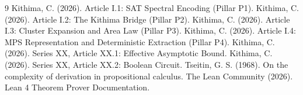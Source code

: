 \documentclass[11pt,a4paper]{article}
\begin{document}

\begin{thebibliography}{9}
  Kithima, C. (2026). Article I.1: SAT Spectral Encoding (Pillar P1).
  Kithima, C. (2026). Article I.2: The Kithima Bridge (Pillar P2).
  Kithima, C. (2026). Article I.3: Cluster Expansion and Area Law (Pillar P3).
  Kithima, C. (2026). Article I.4: MPS Representation and Deterministic Extraction (Pillar P4).
  Kithima, C. (2026). Series XX, Article XX.1: Effective Asymptotic Bound.
  Kithima, C. (2026). Series XX, Article XX.2: Boolean Circuit.
  Tseitin, G. S. (1968). On the complexity of derivation in propositional calculus.
  The Lean Community (2026). Lean 4 Theorem Prover Documentation.
\end{thebibliography}
\end{document}
